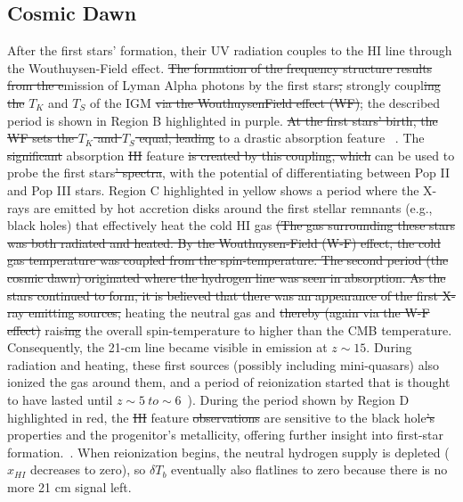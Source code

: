 	\subsection{Cosmic Dawn}
	    
	    After the first stars' formation, their UV radiation couples to the HI line through the Wouthuysen-Field effect.  \st{The formation of the frequency structure results from the e}mission of Lyman Alpha photons by the first stars\st{,} strongly coupl\st{ing the} $T_K$ and $T_S$ of the IGM \st{via the WouthuysenField effect (WF)}; the described period is shown in Region B  highlighted in purple. \st{At the first stars' birth, the WF sets the $ T_K $ and $ T_S $ equal, leading}  to a drastic absorption feature ~\citep{2014ApJ...782L...9V}.  The \st{significant} absorption \st{HI} feature \st{is created by this coupling, which} can be used to probe the  first stars\st{' spectra}, with the potential of differentiating between Pop II and Pop III stars. Region C  highlighted in yellow shows a period where the X-rays are emitted by hot accretion disks around the first stellar remnants (e.g., black holes) that effectively heat the cold HI gas \st{(The gas surrounding these stars was both radiated and heated. By the Wouthuysen-Field (W-F) effect, the cold gas temperature was coupled from the spin-temperature. The second period (the cosmic dawn) originated where the hydrogen line was seen in absorption. As the stars continued to form, it is believed that there was an appearance of the first X-ray emitting sources,}  heating  the neutral gas and  \st{thereby (again via the W-F effect)} rais\st{ing} the overall spin-temperature to higher than the CMB temperature. \\

	    Consequently, the 21-cm line became visible in emission at $z\sim15$. During radiation and heating, these first sources (possibly including mini-quasars) also ionized the gas around them, and a period of reionization started that is thought to have lasted until $z\sim5~to\sim 6$~\citep{2015aska.confE...1K}). During the period shown by Region D  highlighted in red, the \st{HI}  feature \st{observations} are sensitive to the black hole\st{'s} properties and the progenitor's metallicity, offering further insight into first-star formation.~\citep{11}.  When reionization begins, the neutral hydrogen supply is depleted ($x_{HI}$ decreases to zero), so $\delta T_b$ eventually also flatlines to zero because there is no more 21 cm signal left. \\ 
	    
